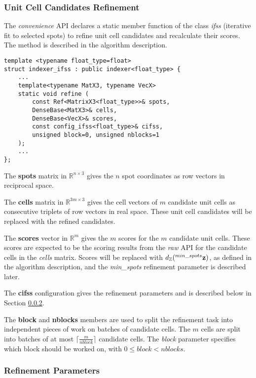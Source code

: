 \documentclass[a4paper,10pt]{article}
\newcommand{\vect}[1]{\mathbf{#1}}
\newcommand{\ceil}[1]{\lceil #1 \rceil}
\newcommand{\distZ}[1]{d_\mathbb{Z}(#1)}
\begin{document}
\subsubsection{Unit Cell Candidates Refinement}

The \emph{convenience} API declares a static member function of the class \emph{ifss} (iterative fit to selected spots) to refine unit cell candidates and recalculate their scores. The method is described in the algorithm description.
%
\begin{lstlisting}
template <typename float_type=float>
struct indexer_ifss : public indexer<float_type> {
    ...
    template<typename MatX3, typename VecX>
    static void refine (
        const Ref<MatrixX3<float_type>>& spots,
        DenseBase<MatX3>& cells,
        DenseBase<VecX>& scores,
        const config_ifss<float_type>& cifss,
        unsigned block=0, unsigned nblocks=1
    );
    ...
};
\end{lstlisting}

The \textbf{spots} matrix in $\mathbb{R}^{n\times 3}$ gives the $n$ spot coordinates as row vectors in reciprocal space.

The \textbf{cells} matrix in $\mathbb{R}^{3m\times 3}$ gives the cell vectors of $m$ candidate unit cells as consecutive triplets of row vectors in real space. These unit cell candidates will be replaced with the refined candidates.

The \textbf{scores} vector in $\mathbb{R}^m$ gives the $m$ scores for the $m$ candidate unit cells. These scores are expected to be the scoring results from the \emph{raw} API for the candidate cells in the \emph{cells} matrix. Scores will be replaced with $\distZ{\prescript{min\_spots}{}{\vect{z}}}$, as defined in the algorithm description, and the \emph{min\_spots} refinement parameter is described later.

The \textbf{cifss} configuration gives the refinement parameters and is described below in Section \ref{subsub:refparams}.

The \textbf{block} and \textbf{nblocks} members are used to split the refinement task into independent pieces of work on batches of candidate cells. The $m$ cells are split into batches of at most $\ceil{\frac{m}{nblock}}$ candidate cells. The \emph{block} parameter specifies which block should be worked on, with $0\leq block < nblocks$.

\subsubsection{Refinement Parameters}\label{subsub:refparams}
\end{document}
